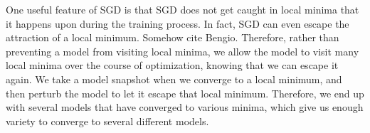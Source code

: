 

One useful feature of SGD is that SGD does not get caught in local minima that it happens upon during the training process.
In fact, SGD can even escape the attraction of a local minimum.
Somehow cite Bengio.
Therefore, rather than preventing a model from visiting local minima, we allow the model to visit many local minima over the course of optimization, knowing that we can escape it again.
We take a model snapshot when we converge to a local minimum, and then perturb the model to let it escape that local minimum. Therefore, we end up with several models that have converged to various minima, which give us enough variety to converge to several different models.

